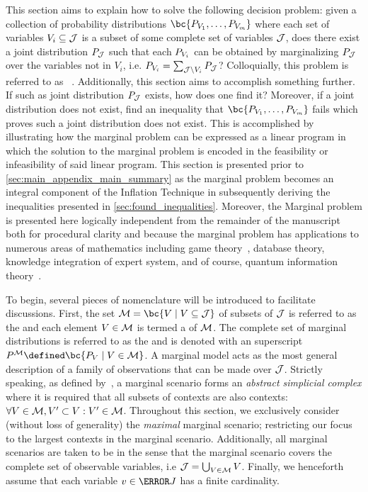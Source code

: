 \documentclass[aps, 10pt, english, twoside, pra, nofootinbib, tightenlines, longbibliography, superscriptaddress]{revtex4-1}
\begin{document}
    This section aims to explain how to solve the following decision problem: given a collection of probability distributions $\bc{\prob[V_1], \ldots, \prob[V_m]}$ where each set of variables $V_{i} \subseteq \mathcal{J}$ is a subset of some complete set of variables $\mathcal{J}$, does there exist a joint distribution $\prob[\jointvar]$ such that each $\prob[V_i]$ can be obtained by marginalizing $\prob[\jointvar]$ over the variables not in $V_i$, i.e. $\prob[V_i] = \sum_{\jointvar \setminus V_i} \prob[\jointvar]$? Colloquially, this problem is referred to as ~\cite{Fritz_2011}. Additionally, this section aims to accomplish something further. If such as joint distribution $\prob[\jointvar]$ exists, how does one find it? Moreover, if a joint distribution does not exist, find an inequality that $\bc{\prob[V_1], \ldots, \prob[V_m]}$ fails which proves such a joint distribution does not exist. This is accomplished by illustrating how the marginal problem can be expressed as a linear program in which the solution to the marginal problem is encoded in the feasibility or infeasibility of said linear program. This section is presented prior to \cref{sec:main_appendix_main_summary} as the marginal problem becomes an integral component of the Inflation Technique in subsequently deriving the inequalities presented in \cref{sec:found_inequalities}. Moreover, the Marginal problem is presented here logically independent from the remainder of the manuscript both for procedural clarity and because the marginal problem has applications to numerous areas of mathematics including game theory~\cite{Vorobev_1962}, database theory, knowledge integration of expert system, and of course, quantum information theory~\cite{Fritz_2011}.

    To begin, several pieces of nomenclature will be introduced to facilitate discussions. First, the set $\mscenario = \bc{V \mid V \subseteq \jointvar}$ of subsets of $\mathcal{J}$ is referred to as the  and each element $V \in \mathcal{M}$ is termed a  of $\mathcal{M}$. The complete set of marginal distributions is referred to as the  and is denoted with an superscript $\prob^{\mscenario} \defined \bc{\prob[V] \mid V \in \mscenario}$. A marginal model acts as the most general description of a family of observations that can be made over $\mathcal{J}$. Strictly speaking, as defined by~\cite{Fritz_2011}, a marginal scenario forms an \textit{abstract simplicial complex} where it is required that all subsets of contexts are also contexts: $\forall V \in \mathcal{M}, V' \subset V : V' \in \mathcal{M}$. Throughout this section, we exclusively consider (without loss of generality) the \textit{maximal} marginal scenario; restricting our focus to the largest contexts in the marginal scenario. Additionally, all marginal scenarios are taken to be  in the sense that the marginal scenario covers the complete set of observable variables, i.e $\mathcal{J} = \bigcup_{V \in \mathcal{M}} V$. Finally, we henceforth assume that each variable $v \in \s J$ has a finite cardinality.
\end{document}
